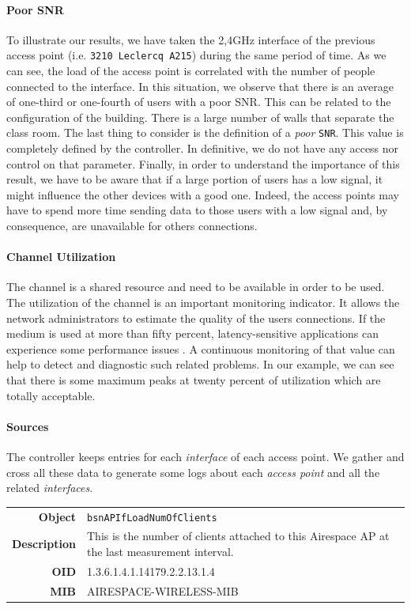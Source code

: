 \paragraph*{Poor SNR} To illustrate our results, we have taken the 2,4GHz interface of the previous access point (i.e. \texttt{3210 Leclercq A215}) during the same period of time. As we can see, the load of the access point is correlated with the number of people connected to the interface. In this situation, we observe that there is an average of one-third or one-fourth of users with a poor SNR. This can be related to the configuration of the building. There is a large number of walls that separate the class room. The last thing to consider is the definition of a \emph{poor} \texttt{SNR}. This value is completely defined by the controller. In definitive, we do not have any access nor control on that parameter. Finally, in order to understand the importance of this result, we have to be aware that if a large portion of users has a low signal, it might influence the other devices with a good one. Indeed, the access points may have to spend more time sending data to those users with a low signal and, by consequence, are unavailable for others connections.

\paragraph*{Channel Utilization} The channel is a shared resource and need to be available in order to be used. The utilization of the channel is an important monitoring indicator. It allows the network administrators to estimate the quality of the users connections. If the medium is used at more than fifty percent, latency-sensitive applications can experience some performance issues \cite{ciscoVowlan}. A continuous monitoring of that value can help to detect and diagnostic such related problems. In our example, we can see that there is some maximum peaks at twenty percent of utilization which are totally acceptable. 


\paragraph*{Sources} The controller keeps entries for each \emph{interface} of each access point. We gather and cross all these data to generate some logs about each \emph{access point} and all the related \emph{interfaces}.

\begin{tabular}{|r l|}
\hline
\textbf{Object} & \texttt{bsnAPIfLoadNumOfClients} \\
\textbf{Description} & \parbox{11cm}{This is the number of clients attached to this Airespace AP at the last measurement interval.} \\
\textbf{OID} & 1.3.6.1.4.1.14179.2.2.13.1.4 \\
\textbf{MIB} & AIRESPACE-WIRELESS-MIB \\
\hline
\end{tabular}

